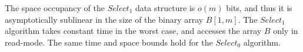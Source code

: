 \begin{theorem}
    The space occupancy of the $Select_1$ data structure is $o(m)$ bits, and thus it is asymptotically sublinear in the size of the binary array $B[1, m]$. The $Select_1$ algorithm takes constant time in the worst case, and accesses the array $B$ only in read-mode. The same time and space bounds hold for the $Select_0$ algorithm. \cite{ferragina2023pearls}
\end{theorem}


